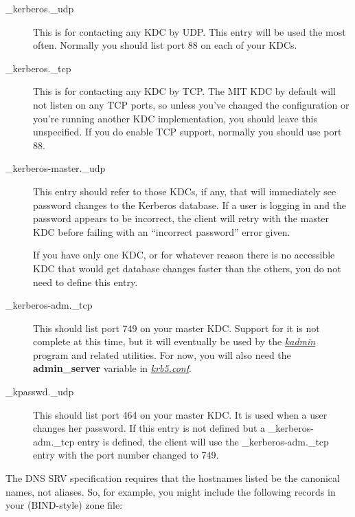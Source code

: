 \documentclass[letterpaper,10pt,english]{sphinxmanual}
\begin{document}
\begin{description}
\item[{\_kerberos.\_udp}] \leavevmode
This is for contacting any KDC by UDP.  This entry will be used
the most often.  Normally you should list port 88 on each of your
KDCs.

\item[{\_kerberos.\_tcp}] \leavevmode
This is for contacting any KDC by TCP.  The MIT KDC by default
will not listen on any TCP ports, so unless you've changed the
configuration or you're running another KDC implementation, you
should leave this unspecified.  If you do enable TCP support,
normally you should use port 88.

\item[{\_kerberos-master.\_udp}] \leavevmode
This entry should refer to those KDCs, if any, that will
immediately see password changes to the Kerberos database.  If a
user is logging in and the password appears to be incorrect, the
client will retry with the master KDC before failing with an
``incorrect password'' error given.

If you have only one KDC, or for whatever reason there is no
accessible KDC that would get database changes faster than the
others, you do not need to define this entry.

\item[{\_kerberos-adm.\_tcp}] \leavevmode
This should list port 749 on your master KDC.  Support for it is
not complete at this time, but it will eventually be used by the
{\hyperref[admin/admin_commands/kadmin_local:kadmin-1]{\emph{kadmin}}} program and related utilities.  For now, you will
also need the \textbf{admin\_server} variable in {\hyperref[admin/conf_files/krb5_conf:krb5-conf-5]{\emph{krb5.conf}}}.

\item[{\_kpasswd.\_udp}] \leavevmode
This should list port 464 on your master KDC.  It is used when a
user changes her password.  If this entry is not defined but a
\_kerberos-adm.\_tcp entry is defined, the client will use the
\_kerberos-adm.\_tcp entry with the port number changed to 749.

\end{description}

The DNS SRV specification requires that the hostnames listed be the
canonical names, not aliases.  So, for example, you might include the
following records in your (BIND-style) zone file:
\end{document}
